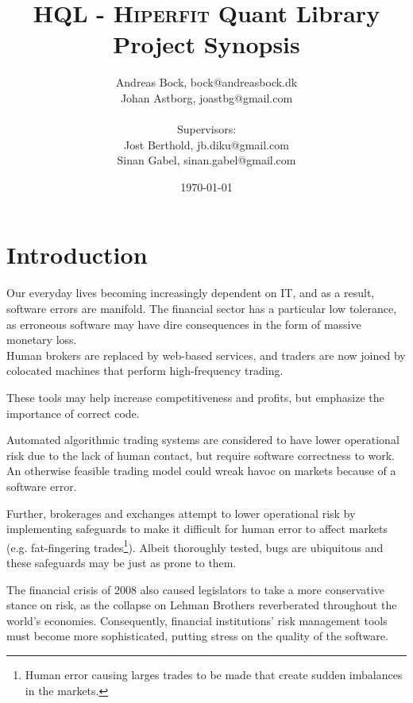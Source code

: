 \documentclass[11pt]{article}
\makeatletter
\def\Author{Andreas Bock, bock@andreasbock.dk\\
Johan Astborg, joastbg@gmail.com\\\\
Supervisors:\\
Jost Berthold, jb.diku@gmail.com\\
Sinan Gabel, sinan.gabel@gmail.com
}
\def\Title{\bf HQL - \textsc{Hiperfit} Quant Library\\ {\Large Project Synopsis}}
\makeatother
\begin{document}
\title{\Title}
\author{\Author}
\date{\today}
\maketitle

\begin{abstract}


\end{abstract}

\section*{Introduction}

Our everyday lives becoming increasingly dependent on IT, and as a result, software
errors are manifold. The financial sector has a particular low tolerance, as erroneous
software may have dire consequences in the form of massive monetary loss.\\
Human brokers are replaced by web-based services, and traders are now joined by
colocated machines that perform high-frequency trading.


These tools may help increase competitiveness and profits, but emphasize the
importance of correct code.

Automated algorithmic trading systems are considered to have lower operational risk due to the lack
of human contact, but require software correctness to work. An otherwise feasible
trading model could wreak havoc on markets because of a software error.

Further, brokerages and exchanges attempt to lower operational risk by implementing
safeguards to make it difficult for human error to affect markets (e.g. fat-fingering
trades\footnote{Human error causing larges trades to be made that create sudden
imbalances in the markets.}). Albeit thoroughly tested, bugs are ubiquitous and these
safeguards may be just as prone to them. 

The financial crisis of 2008 also caused legislators to take a more conservative
stance on risk, as the collapse on Lehman Brothers reverberated throughout
the world's economies.
Consequently, financial institutions' risk management tools must become more
sophisticated, putting stress on the quality of the software.
\end{document}

